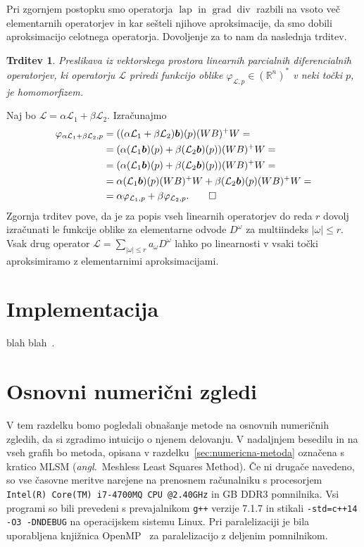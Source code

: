 \documentclass[a4paper,twoside]{article}
\theoremstyle{definition} %
\theoremstyle{plain} %
\newtheorem{trditev}[definicija]{Trditev}
\numberwithin{equation}{section}
\newcommand{\R}{\mathbb R}
\renewcommand{\L}{\mathcal{L}}
\newcommand{\lap}{\operatorname{lap}}
\renewcommand{\div}{\operatorname{div}}
\newcommand{\grad}{\operatorname{grad}}
\renewcommand{\b}{\boldsymbol}
\renewcommand{\phi}{\varphi}
\newcommand{\ang}[1]{(\textit{angl.}\ #1)}
\begin{document}
Pri zgornjem postopku smo operatorja $\lap$ in $\grad \div$ razbili na vsoto več elementarnih
operatorjev in kar sešteli njihove aproksimacije, da smo dobili aproksimacijo celotnega operatorja.
Dovoljenje za to nam da naslednja trditev.

\begin{trditev}
  Preslikava iz vektorskega prostora linearnih parcialnih diferencialnih operatorjev, ki operatorju
  $\L$ priredi funkcijo oblike $\phi_{\L,p} \in (\R^n)^\ast$ v neki točki $p$, je homomorfizem.
\end{trditev}
\proof
Naj bo $\L = \alpha \L_1 + \beta \L_2$. Izračunajmo
  \begin{align*}
    \phi_{\alpha \L_1 + \beta \L_2,p} &=
    ((\alpha \L_1 + \beta \L_2)\b b)(p)(WB)^+W = \\
    &= (\alpha (\L_1\b b)(p) + \beta (\L_2\b b)(p))(WB)^+W = \\
    &= (\alpha (\L_1\b b)(p) + \beta (\L_2\b b)(p))(WB)^+W =\\
  &= \alpha (\L_1\b b)(p)(WB)^+W + \beta (\L_2\b b)(p)(WB)^+W = \\
  &= \alpha \phi_{\L_1,p} + \beta \phi_{\L_2,p}. \qedhere
  \end{align*}
\endproof
Zgornja trditev pove, da je za popis vseh linearnih operatorjev do reda $r$ dovolj
izračunati le funkcije oblike za elementarne odvode $D^\omega$ za multiindeks $|\omega| \leq r$.
Vsak drug operator $\L = \sum_{|\omega| \leq r} a_\omega D^\omega$ lahko po linearnosti
v vsaki točki aproksimiramo z elementarnimi aproksimacijami.

\section{Implementacija}
\label{sec:implementacija}
blah blah~\cite{stroustrup1995c++}.

\section{Osnovni numerični zgledi}
\label{sec:osnovni-zgledi}
V tem razdelku bomo pogledali obnašanje metode na osnovnih numeričnih zgledih, da si zgradimo
intuicijo o njenem delovanju. V nadaljnjem besedilu in na vseh grafih bo metoda, opisana v
razdelku~\ref{sec:numericna-metoda} označena s kratico MLSM \ang{Meshless Least Squares Method}.  Če
ni drugače navedeno, so vse časovne meritve narejene na prenosnem računalniku s procesorjem
\verb|Intel(R) Core(TM) i7-4700MQ CPU @2.40GHz| in \unit[16]{GB} DDR3 pomnilnika. Vsi programi so
bili prevedeni s prevajalnikom \verb|g++| verzije 7.1.7 in stikali \verb|-std=c++14 -O3 -DNDEBUG| na
operacijskem sistemu Linux.  Pri paralelizaciji je bila uporabljena knjižnica
OpenMP~\cite{dagum1998openmp} za paralelizacijo z deljenim pomnilnikom.
\end{document}

